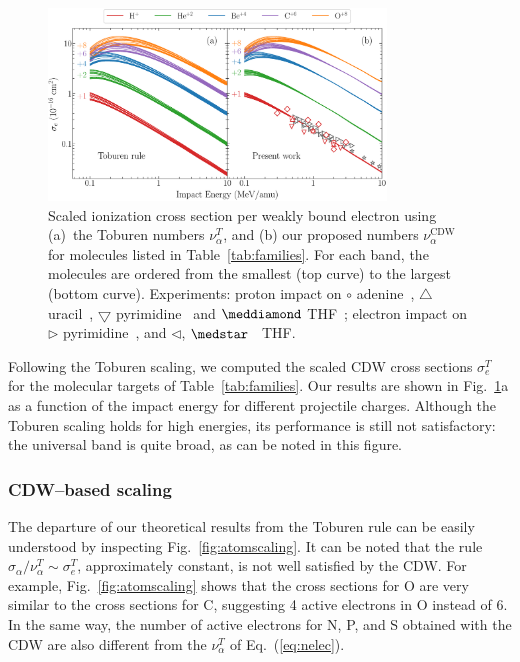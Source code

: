 \documentclass[10pt,showpacs,showkeys,twocolumn]{revtex4}
\begin{document}
\begin{figure}[t!]
\centering
\includegraphics[width=0.8\textwidth]{figuras/molscaling85.eps}
\caption{Scaled ionization cross section per weakly bound electron using
(a)~the Toburen numbers $\nu_{\alpha}^T$, and (b) our proposed numbers
$\nu_{\alpha}^{\text{CDW}}$ for molecules listed in Table~\ref{tab:families}. 
For each band, the molecules are ordered from the smallest (top curve) to the
largest (bottom curve). Experiments: proton impact on 
\mbox{\Large$\circ$} adenine~\cite{iriki2011}, 
$\triangle$ uracil~\cite{itoh2013}, 
$\bigtriangledown$ pyrimidine~\cite{wolff2014} and $\meddiamond$ 
THF~\cite{wang2016}; electron impact on $\rhd$ pyrimidine~\cite{bug2017},
and $\lhd$, $\medstar$~\cite{wolf2019,fuss2009} THF.}
\label{fig:newscaling}
\end{figure}

Following the Toburen scaling, we computed the scaled CDW cross sections 
$\sigma_{e}^T$ for the molecular targets of Table~\ref{tab:families}.
Our results are shown in Fig.~\ref{fig:newscaling}a as a function of 
the impact energy for different projectile charges. Although the 
Toburen scaling holds for high energies, its performance is still not 
satisfactory: the universal band is quite broad, as can be noted in 
this figure.

\subsubsection{CDW--based scaling}

The departure of our theoretical 
results from the Toburen rule can be easily understood 
by inspecting Fig.~\ref{fig:atomscaling}. It can be noted that the 
rule $\sigma_{\alpha}/\nu_{\alpha}^T\sim \sigma_{e}^T$, approximately 
constant, is not well satisfied by the CDW. 
For example, Fig.~\ref{fig:atomscaling} shows that the cross sections
for O are very similar to the cross sections for C, suggesting 
4 active electrons in O instead of 6. In the same way, the number of
active electrons for N, P, and S obtained with the CDW are also 
different from the $\nu_{\alpha}^T$ of Eq.~(\ref{eq:nelec}). 
\end{document}

